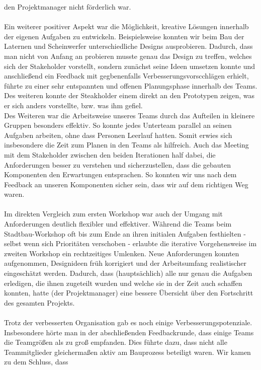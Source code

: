 \documentclass{article}
\begin{document}
den Projektmanager nicht förderlich war.
\\
\\
Ein weiterer positiver Aspekt war die Möglichkeit, kreative Lösungen innerhalb
der eigenen Aufgaben zu entwickeln. Beispielsweise konnten wir beim Bau der
Laternen und Scheinwerfer unterschiedliche Designs ausprobieren. 
Dadurch, dass man nicht von Anfang an probieren musste genau das Design zu treffen, welches sich der Stakeholder vorstellt, sondern zunächst seine Ideen umsetzen konnte und anschließend ein Feedback mit gegbenenfalls
Verbesserungsvorscchlägen erhielt, führte zu einer sehr entspannten und offenen Planungsphase 
innerhalb des Teams. Des weiteren konnte der Steakholder einem direkt an den Prototypen zeigen, was er sich 
anders vorstellte, bzw. was ihm gefiel.
\\
Des Weiteren war die Arbeitsweise unseres Teams durch das Aufteilen in kleinere
Gruppen besonders effektiv. So konnte jedes Unterteam parallel an seinen Aufgaben arbeiten, ohne
dass Personen Leerlauf hatten. Somit erwies sich insbesondere die Zeit zum Planen
in den Teams als hilfreich. Auch das Meeting mit dem Stakeholder zwischen den
beiden Iterationen half dabei, die Anforderungen besser zu verstehen und
sicherzustellen, dass die gebauten Komponenten den Erwartungen entsprachen.
So konnten wir uns nach dem Feedback an unseren Komponenten sicher sein, dass
wir auf dem richtigen Weg waren.
\\
\\
Im direkten Vergleich zum ersten Workshop war auch der Umgang mit Anforderungen deutlich flexibler und effektiver.
Während die Teams beim Stadtbau-Workshop oft bis zum Ende an ihren initialen Aufgaben festhielten - selbst wenn sich Prioritäten verschoben - erlaubte die iterative Vorgehensweise im zweiten Workshop ein rechtzeitiges Umlenken. Neue Anforderungen konnten aufgenommen, Designideen früh korrigiert und der Arbeitsumfang realistischer eingeschätzt werden. Dadurch, dass (hauptsächlich) alle nur genau die Aufgaben erledigen, die 
ihnen zugeteilt wurden und welche sie in der Zeit auch schaffen konnten, hatte (der Projektmanager) eine bessere Übersicht über den Fortschritt des gesamten Projekts.
\\
\\
Trotz der verbesserten Organisation gab es noch einige Verbesserungspotenziale.
Insbesondere hörte man in der abschließenden Feedbackrunde, dass einige Teams
die Teamgrößen als zu groß empfanden. Dies führte dazu, dass nicht alle Teammitglieder
gleichermaßen aktiv am Bauprozess beteiligt waren. Wir kamen zu dem Schluss, dass
\end{document}

